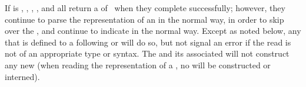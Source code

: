% 
% 
% 
% 
% 
% 
% 
% 
% 
% 
% 
% 
% 
% 

If  is ,
      ,
      ,
      ,
  and 
all return a  of \nil\ when they complete successfully;
however, they continue to parse the representation of an 
in the normal way, in order to skip over the ,
and continue to indicate  in the normal way.
Except as noted below,
any  
that is defined to  
a following  or  
will do so,
but not signal an error if the 
read is not of an appropriate type or syntax.
The  and its associated 
will not construct any new  
 (\eg when reading the representation of a ,
      no  will be constructed or interned).

